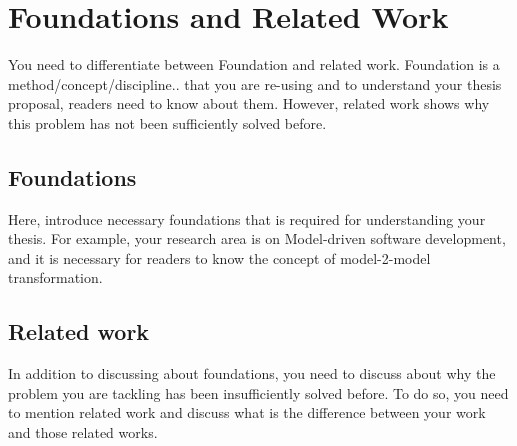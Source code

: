 
\chapter{Foundations and Related Work}
\label{chap:foundation}

You need to differentiate between Foundation and related work. Foundation is a method/concept/discipline.. that you are re-using and to understand your thesis proposal, readers need to know about them. However, related work shows why this problem has not been sufficiently solved before.

\section{Foundations}
Here, introduce necessary foundations that is required for understanding your thesis. For example, your research area is on Model-driven software development, and it is necessary for readers to know the concept of model-2-model transformation.
\section{Related work}
In addition to discussing about foundations, you need to discuss about why the problem you are tackling has been insufficiently solved before. To do so, you need to mention related work and discuss what is the difference between your work and those related works.
